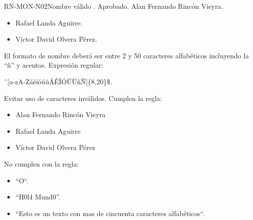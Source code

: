 %
\begin{BusinessRule}{RN-MON-N02}{Nombre válido}
	{\bcIntegridad}
	{\btEnabler}
	{\blControlling}
	.
	\BRItem[Estado] Aprobado.
	 Alan Fernando Rincón Vieyra.
	 \cdtEmpty
	\begin{itemize}
		\item Rafael Landa Aguirre.
		\item Víctor David Olvera Pérez.
	\end{itemize}
	\BRItem[Descripción] El formato de nombre deberá ser entre 2 y 50 
	caracteres alfabéticos incluyendo la “ñ” y acentos.
	\BRItem[Sentencia] Expresión regular:
	\begin{center}
		\^\ [a-zA-ZáéíóúüÁÉÍÓÚÜñÑ]\{8,20\}\$.
	\end{center}
	\BRItem[Motivación] Evitar uso de caracteres inválidos.
	 Cumplen la regla:
	\begin{itemize}
		\item Alan Fernando Rincón Vieyra
		\item Rafael Landa Aguirre
		\item Víctor David Olvera Pérez
	\end{itemize}
	 No cumplen con la regla:
	\begin{itemize}
		\item “O“.
		\item “H0l4 Mund0”.
		\item “Esto es un texto con mas de cincuenta caracteres alfabéticos“.
	\end{itemize}
\end{BusinessRule}

